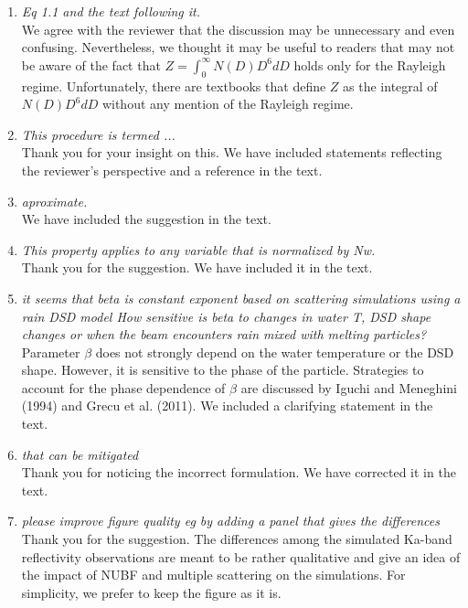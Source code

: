 \documentclass[12pt]{article}
\begin{document}
\begin{enumerate}
\item {\textit{Eq 1.1 and the text following it.}\\
    We agree with the reviewer that the discussion may be unnecessary and even confusing.  Nevertheless, we thought it may be 
    useful to readers that may not be aware of the fact that $Z=\int _0 ^{\infty} N(D) D^6 dD$ holds only for the Rayleigh regime. 
    Unfortunately, there are textbooks that define $Z$ as the integral of $N(D) D^6 dD$ without any mention of the Rayleigh regime.
}
\item {\textit{This  procedure is termed ...}\\
Thank you for your insight on this.  We have included statements reflecting the reviewer's perspective and a reference 
in the text.
}

\item {\textit{aproximate.}\\
We have included the suggestion in the text.
}

\item {\textit{This property applies to any variable that is normalized by Nw.}\\
Thank you for the suggestion.  We have included it in the text.
}

\item{\textit{it seems that beta is constant exponent based on scattering simulations using a rain DSD model
How sensitive is beta to changes in water T, DSD shape changes or when the beam encounters
rain mixed with melting particles?}\\
Parameter $\beta$ does not strongly depend on the water temperature or the DSD shape.  However, it is sensitive to the 
phase of the particle. Strategies to account for the phase dependence of $\beta$ are discussed by Iguchi and Meneghini (1994)
and Grecu et al. (2011). We included a clarifying statement in the text.}

\item{\textit{that can be mitigated}\\
Thank you for noticing the incorrect formulation.  We have corrected it in the text.
}

\item{\textit{please improve figure quality eg by adding a panel that gives the differences}\\
Thank you for the suggestion. The differences among the simulated Ka-band reflectivity observations are meant to be rather qualitative and
give an idea of the impact of NUBF and multiple scattering on the simulations. For simplicity, we prefer to keep the figure as it is.
}


\end{enumerate}
\end{document}
